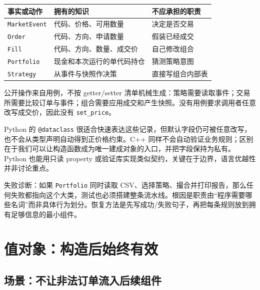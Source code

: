 \begin{center}
\begin{tabular}{lll}
\toprule
事实或动作 & 拥有的知识 & 不应承担的职责 \\
\midrule
\texttt{MarketEvent} & 代码、价格、可用数量 & 决定是否交易 \\
\texttt{Order} & 代码、方向、申请数量 & 假装已经成交 \\
\texttt{Fill} & 代码、方向、数量、成交价 & 自己修改组合 \\
\texttt{Portfolio} & 现金和本次运行的单代码持仓 & 猜测策略意图 \\
\texttt{Strategy} & 从事件与快照作决策 & 直接写组合内部表 \\
\bottomrule
\end{tabular}
\end{center}

公开操作来自用例，不按 getter/setter 清单机械生成：策略需要读取事件；交易所需要比较订单与事件；组合需要应用成交和产生快照。没有用例要求调用者任意改写成交价，因此没有 \texttt{set\_price}。

\begin{pythonbridge}
Python 的 \texttt{@dataclass} 很适合快速表达这些记录，但默认字段仍可被任意改写，也不会从类型声明自动得到正价格约束。C++ 同样不会自动验证业务规则；区别在于我们可以让构造函数成为唯一建成对象的入口，并把字段保持为私有。Python 也能用只读 property 或验证库实现类似契约，关键在于边界，语言优越性并非讨论重点。

\end{pythonbridge}

失败诊断：如果 \texttt{Portfolio} 同时读取 CSV、选择策略、撮合并打印报告，那么任何失败都指向这个大类，测试也必须搭建整条流水线。根因是职责由“程序需要哪些名词”而非具体行为划分。恢复方法是先写成功/失败句子，再把每条规则放到拥有足够信息的最小组件。

\section{值对象：构造后始终有效}

\subsection{场景：不让非法订单流入后续组件}

